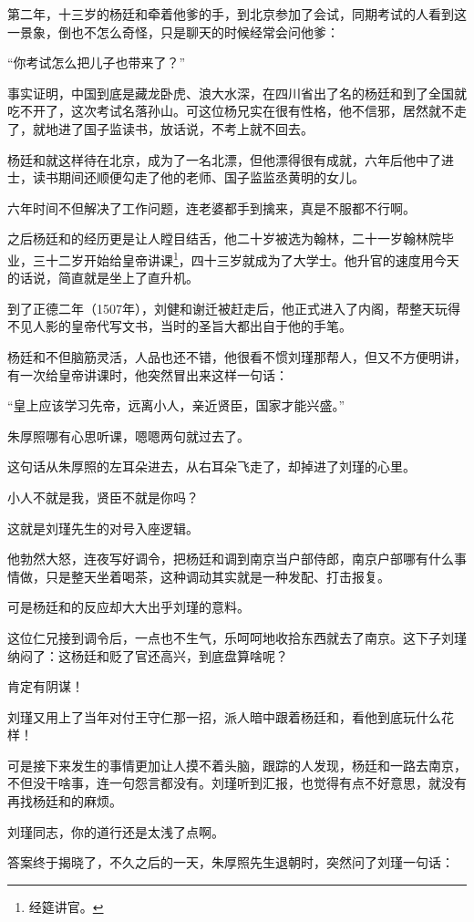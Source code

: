 \begin{multicols}{\theparacolNo}
第二年，十三岁的杨廷和牵着他爹的手，到北京参加了会试，同期考试的人看到这一景象，倒也不怎么奇怪，只是聊天的时候经常会问他爹：

“你考试怎么把儿子也带来了？”

事实证明，中国到底是藏龙卧虎、浪大水深，在四川省出了名的杨廷和到了全国就吃不开了，这次考试名落孙山。可这位杨兄实在很有性格，他不信邪，居然就不走了，就地进了国子监读书，放话说，不考上就不回去。

杨廷和就这样待在北京，成为了一名北漂，但他漂得很有成就，六年后他中了进士，读书期间还顺便勾走了他的老师、国子监监丞黄明的女儿。

六年时间不但解决了工作问题，连老婆都手到擒来，真是不服都不行啊。

之后杨廷和的经历更是让人瞠目结舌，他二十岁被选为翰林，二十一岁翰林院毕业，三十二岁开始给皇帝讲课\footnote{经筵讲官。}，四十三岁就成为了大学士。他升官的速度用今天的话说，简直就是坐上了直升机。

到了正德二年（1507年），刘健和谢迁被赶走后，他正式进入了内阁，帮整天玩得不见人影的皇帝代写文书，当时的圣旨大都出自于他的手笔。

杨廷和不但脑筋灵活，人品也还不错，他很看不惯刘瑾那帮人，但又不方便明讲，有一次给皇帝讲课时，他突然冒出来这样一句话：

“皇上应该学习先帝，远离小人，亲近贤臣，国家才能兴盛。”

朱厚照哪有心思听课，嗯嗯两句就过去了。

这句话从朱厚照的左耳朵进去，从右耳朵飞走了，却掉进了刘瑾的心里。

小人不就是我，贤臣不就是你吗？

这就是刘瑾先生的对号入座逻辑。

他勃然大怒，连夜写好调令，把杨廷和调到南京当户部侍郎，南京户部哪有什么事情做，只是整天坐着喝茶，这种调动其实就是一种发配、打击报复。

可是杨廷和的反应却大大出乎刘瑾的意料。

这位仁兄接到调令后，一点也不生气，乐呵呵地收拾东西就去了南京。这下子刘瑾纳闷了：这杨廷和贬了官还高兴，到底盘算啥呢？

肯定有阴谋！

刘瑾又用上了当年对付王守仁那一招，派人暗中跟着杨廷和，看他到底玩什么花样！

可是接下来发生的事情更加让人摸不着头脑，跟踪的人发现，杨廷和一路去南京，不但没干啥事，连一句怨言都没有。刘瑾听到汇报，也觉得有点不好意思，就没有再找杨廷和的麻烦。

刘瑾同志，你的道行还是太浅了点啊。

答案终于揭晓了，不久之后的一天，朱厚照先生退朝时，突然问了刘瑾一句话：


\end{multicols}
